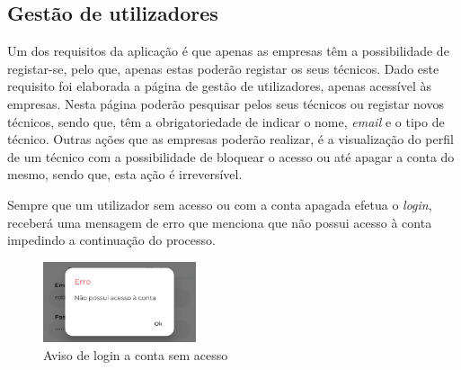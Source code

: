 \subsection{Gestão de utilizadores}
Um dos requisitos da aplicação é que apenas as empresas têm a possibilidade de registar-se, pelo que, apenas estas poderão registar os seus técnicos. Dado este requisito foi elaborada a página de gestão de utilizadores, apenas acessível às empresas. Nesta página poderão pesquisar pelos seus técnicos ou registar novos técnicos, sendo que, têm a obrigatoriedade de indicar o nome, \textit{email} e o tipo de técnico. Outras ações que as empresas poderão realizar, é a visualização do perfil de um técnico com a possibilidade de bloquear o acesso ou até apagar a conta do mesmo, sendo que, esta ação é irreversível.

\begin{figure}[htb]%
 \centering
 \qquad
 \label{fig:70}%
\end{figure}

Sempre que um utilizador sem acesso ou com a conta apagada efetua o \textit{login}, receberá uma mensagem de erro que menciona que não possui acesso à conta impedindo a continuação do processo.

\begin{figure}[htb]
 \centering
 \includegraphics[width=0.4\textwidth]{images/implementacao/frontend/gestao_users/1686054218243.jpg}
 \caption{Aviso de login a conta sem acesso}
 \label{fig:71}
\end{figure}